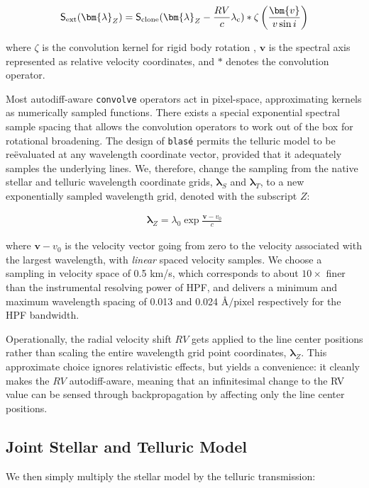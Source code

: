 \documentclass[modern]{aastex631}
\begin{document}
\begin{eqnarray}
    \mathsf{S}_{\rm ext}(\bm{\lambda}_Z) = \mathsf{S}_{\rm clone}(\bm{\lambda}_Z - \frac{RV}{c}\lambda_\mathrm{c}) * \zeta \left(\frac{\bm{v}}{v\sin{i}}\right) \label{eqn_convolution}
\end{eqnarray}

where $\zeta$ is the convolution kernel for rigid body rotation \citep{2022ApJS..258...31K}, $\bm{v}$ is the spectral axis represented as relative velocity coordinates, and $*$ denotes the convolution operator.

Most autodiff-aware \texttt{convolve} operators act in pixel-space, approximating kernels as numerically sampled functions.  There exists a special exponential spectral sample spacing that allows the convolution operators to work out of the box for rotational broadening.  The design of \texttt{blas\'e} permits the telluric model to be re\"evaluated at any wavelength coordinate vector, provided that it adequately samples the underlying lines.  We, therefore, change the sampling from the native stellar and telluric wavelength coordinate grids, $\bm{\lambda}_S$ and $\bm{\lambda}_T$, to a new exponentially sampled wavelength grid, denoted with the subscript $Z$:

\begin{eqnarray}
    \bm{\lambda}_Z = \lambda_0  \exp{\frac{\bm{v}-v_0}{c}}
\end{eqnarray}

where $\bm{v}-v_0$ is the velocity vector going from zero to the velocity associated with the largest wavelength, with \emph{linear} spaced velocity samples.  We choose a sampling in velocity space of 0.5 km/s, which corresponds to about $10\times$ finer than the instrumental resolving power of HPF, and delivers a minimum and maximum wavelength spacing of 0.013 and 0.024 \AA$/\text{pixel}$ respectively for the HPF bandwidth.

Operationally, the radial velocity shift $RV$ gets applied to the line center positions rather than scaling the entire wavelength grid point coordinates, $\bm{\lambda}_Z$. This approximate choice ignores relativistic effects, but yields a convenience: it cleanly makes the $RV$ autodiff-aware, meaning that an infinitesimal change to the RV value can be sensed through backpropagation by affecting only the line center positions.


\subsection{Joint Stellar and Telluric Model}
We then simply multiply the stellar model by the telluric transmission:
\end{document}

